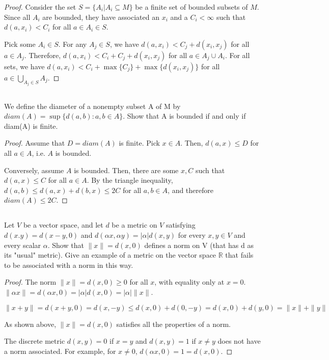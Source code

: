 \begin{proof}
Consider the set $S = \{A_i | A_i \subseteq M\}$ be a finite set of bounded subsets of $M$. Since all $A_i$ are bounded, they have associated an $x_i$ and a $C_i < \infty$ such that $d(a, x_i) < C_i$ for all $a \in A_i \in S$.


Pick some $A_i \in S$. For any $A_j \in S$, we have $d(a, x_i) < C_j + d(x_i, x_j)$ for all $a \in A_j$. Therefore, $d(a, x_i) < C_i + C_j + d(x_i, x_j)$ for all $a \in A_j \cup A_i$. For all sets, we have $d(a, x_i) < C_i + \max\{C_j\} + \max\{d(x_i, x_j)\}$ for all $a \in \bigcup_{A_j \in S} A_j$.




\end{proof}



\subsection{} We define the diameter of a nonempty subset A of M by $diam(A) = \sup\{d(a, b) : a,b \in A\}$.  Show that A is bounded if and only if diam(A) is finite.

\begin{proof}
Assume that $D = diam(A)$ is finite. Pick $x \in A$. Then, $d(a, x) \leq D$ for all $a \in A$, i.e. $A$ is bounded.

Conversely, assume $A$ is bounded. Then, there are some $x,C$ such that $d(a,x) \leq C$ for all $a \in A$. By the triangle inequality, $d(a,b) \leq d(a,x) + d(b,x) \leq 2C$ for all $a,b\in A$, and therefore $diam(A) \leq 2C$.
\end{proof}

\subsection{} Let $V$  be  a vector space,  and let $d$ be a metric on  $V$ satisfying $d(x. y) = d(x -y, 0)$ and $d(\alpha x, \alpha y) = |\alpha| d(x, y)$ for every $x, y \in V$ and every scalar $\alpha$. Show that $\| x \| = d(x, 0)$ defines a norm on V (that has d as its "usual" metric). Give an example of a metric on the vector space $\mathbb{R}$ that fails to be associated with a norm in this way.

\begin{proof}
The norm $\| x \| = d(x, 0) \geq 0$ for all $x$, with equality only at $x=0$. $\| \alpha x \| = d(\alpha x, 0) = |\alpha| d(x,0) = |\alpha| \|x\|$.

$\|x+y\| = d(x+y, 0) = d(x, -y) \leq d(x, 0) + d(0, -y) =
d(x, 0) + d(y, 0) = \|x\| + \|y\|$

As shown above, $\| x \| = d(x, 0)$ satisfies all the properties of a norm. 

The discrete metric $d(x,y) = 0$ if $x=y$ and $d(x,y) = 1$ if $x \neq y$ does not have a norm associated. For example, for $x\neq0$, $d(\alpha x, 0) = 1 = d(x, 0)$.
\end{proof}


